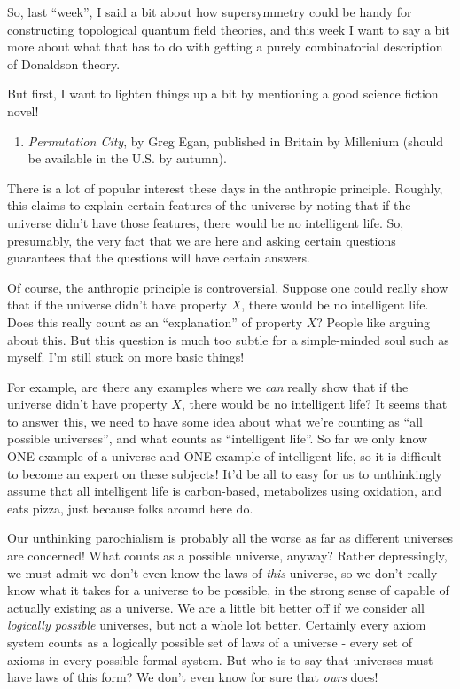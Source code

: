 \documentclass{article}
\def\tightlist{}
\begin{document}
So, last ``week'', I said a bit about how supersymmetry could be handy
for constructing topological quantum field theories, and this week I
want to say a bit more about what that has to do with getting a purely
combinatorial description of Donaldson theory.

But first, I want to lighten things up a bit by mentioning a good
science fiction novel!

\begin{enumerate}
\def\labelenumi{\arabic{enumi})}
\tightlist
\item
  \emph{Permutation City}, by Greg Egan, published in Britain by
  Millenium (should be available in the U.S. by autumn).
\end{enumerate}

There is a lot of popular interest these days in the anthropic
principle. Roughly, this claims to explain certain features of the
universe by noting that if the universe didn't have those features,
there would be no intelligent life. So, presumably, the very fact that
we are here and asking certain questions guarantees that the questions
will have certain answers.

Of course, the anthropic principle is controversial. Suppose one could
really show that if the universe didn't have property \(X\), there would
be no intelligent life. Does this really count as an ``explanation'' of
property \(X\)? People like arguing about this. But this question is
much too subtle for a simple-minded soul such as myself. I'm still stuck
on more basic things!

For example, are there any examples where we \emph{can} really show that
if the universe didn't have property \(X\), there would be no
intelligent life? It seems that to answer this, we need to have some
idea about what we're counting as ``all possible universes'', and what
counts as ``intelligent life''. So far we only know ONE example of a
universe and ONE example of intelligent life, so it is difficult to
become an expert on these subjects! It'd be all to easy for us to
unthinkingly assume that all intelligent life is carbon-based,
metabolizes using oxidation, and eats pizza, just because folks around
here do.

Our unthinking parochialism is probably all the worse as far as
different universes are concerned! What counts as a possible universe,
anyway? Rather depressingly, we must admit we don't even know the laws
of \emph{this} universe, so we don't really know what it takes for a
universe to be possible, in the strong sense of capable of actually
existing as a universe. We are a little bit better off if we consider
all \emph{logically possible} universes, but not a whole lot better.
Certainly every axiom system counts as a logically possible set of laws
of a universe - every set of axioms in every possible formal system. But
who is to say that universes must have laws of this form? We don't even
know for sure that \emph{ours} does!
\end{document}
